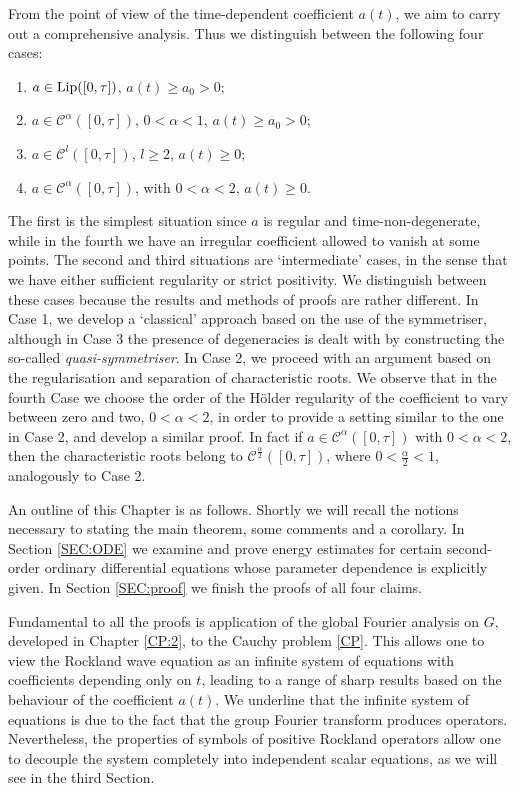 \documentclass[12pt,oneside,a4paper]{book}
\numberwithin{equation}{section}     %
\theoremstyle{plain}
\theoremstyle{definition}
\begin{document}
From the point of view of the time-dependent coefficient $a(t)$, we aim to carry out a comprehensive analysis. Thus we distinguish between the following four cases:
\begin{enumerate}
	\item $a\in\mathcal {\rm Lip}([0,\tau])$, $a(t)\geq a_0>0$;
	\item $a\in\mathcal C^\alpha([0,\tau])$, $0<\alpha<1$, $a(t)\geq a_0 >0$;
	\item $a\in\mathcal C^l([0,\tau])$, $l \geq 2$, $a(t)\geq 0$;
	\item $a\in\mathcal C^\alpha([0,\tau])$, with $0<\alpha<2$, $a(t)\geq0$.
\end{enumerate}
The first is the simplest situation since $a$ is regular and time-non-degenerate, while in the fourth we have an irregular coefficient allowed to vanish at some points. The second and third situations are `intermediate' cases, in the sense that we have either sufficient regularity or strict positivity. We distinguish between these cases because the results and methods of proofs are rather different. In Case 1, we develop a `classical' approach based on the use of the symmetriser, although in Case 3 the presence of degeneracies is dealt with by constructing the so-called \textit{quasi-symmetriser}. In Case 2, we proceed with an argument based on the regularisation and separation of characteristic roots. We observe that in the fourth Case we choose the order of the H\"older regularity of the coefficient to vary between zero and two, $0<\alpha<2$, in order to provide a setting similar to the one in Case 2, and develop a similar proof. In fact if $a\in\mathcal C^\alpha([0,\tau])$ with $0<\alpha<2$, then the characteristic roots belong to $\mathcal C^{\frac{\alpha}{2}}([0,\tau])$, where $0<\frac{\alpha}{2}<1$, analogously to Case 2.

An outline of this Chapter is as follows. Shortly we will recall the notions necessary to stating the main theorem, some comments and a corollary. In Section \ref{SEC:ODE} we examine and prove energy estimates for certain second-order ordinary differential equations whose parameter dependence is explicitly given. In Section \ref{SEC:proof} we finish the proofs of all four claims.

Fundamental to all the proofs is application of the global Fourier analysis on $G$, developed in Chapter \ref{CP:2}, to the Cauchy problem \eqref{CP}. This allows one to view the Rockland wave equation as an infinite system of equations with coefficients depending only on $t$, leading to a range of sharp results based on the behaviour of the coefficient $a(t)$. We underline that the infinite system of equations is due to the fact that the group Fourier transform produces operators. Nevertheless, the properties of symbols of positive Rockland operators allow one to decouple the system completely into independent scalar equations, as we will see in the third Section.
\end{document}
